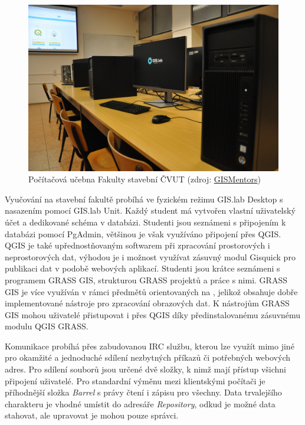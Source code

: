 \begin{figure}[H] \centering
    \includegraphics[width=350pt]{./pictures/classroom.jpg}
    \caption[Počítačová učebna Fakulty stavební ČVUT]{Počítačová učebna Fakulty stavební ČVUT (zdroj:
	\href{http://gismentors.cz/wp-content/uploads/2018/12/DSC_0051.jpg}{GISMentors})}
    \label{fig:gisquick-welcome}
\end{figure}

Vyučování na stavební fakultě probíhá ve fyzickém režimu GIS.lab Desktop s nasazením
pomocí GIS.lab Unit. Každý student má vytvořen vlastní uživatelský
účet a dedikované schéma v databázi. Studenti jsou seznámeni s
připojením k databázi pomocí PgAdmin, většinou je však využíváno
připojení přes QGIS. QGIS je také upřednostňovaným softwarem při
zpracování prostorových i neprostorových dat, výhodou je i možnost
využívat zásuvný modul Gisquick pro publikaci dat v podobě webových
aplikací. Studenti jsou krátce seznámeni s programem GRASS GIS,
strukturou GRASS projektů a práce s nimi. GRASS GIS je více využíván v
rámci předmětů orientovaných na , jelikož obsahuje dobře
implementované nástroje pro zpracování obrazových dat. K nástrojům
GRASS GIS mohou uživatelé přistupovat i přes QGIS  díky
předinstalovanému zásuvnému modulu QGIS GRASS.

Komunikace probíhá přes zabudovanou IRC službu, kterou lze využít mimo
jiné pro okamžité a jednoduché sdílení nezbytných příkazů či
potřebných webových adres. Pro sdílení souborů jsou určené dvě složky,
k nimž mají přístup všichni připojení uživatelé. Pro standardní výměnu
mezi klientskými počítači je příhodnější složka \textit{Barrel} s
právy čtení i zápisu pro všechny. Data trvalejšího charakteru je
vhodné umístit do adresáře \textit{Repository}, odkud je možné data
stahovat, ale upravovat je mohou pouze správci.

